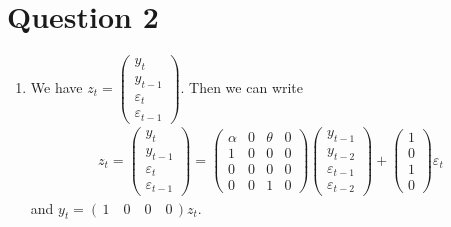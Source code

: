\documentclass[12pt]{article}
\begin{document}
\section*{Question 2}
\begin{enumerate}[label=\alph*.]
    \item We have $z_t = \begin{pmatrix}
        y_t \\
        y_{t-1} \\
        \varepsilon_t \\
        \varepsilon_{t-1}
    \end{pmatrix}$. Then we can write
    \begin{align*}
        z_t = \begin{pmatrix}
            y_t \\
            y_{t-1} \\
            \varepsilon_t \\
            \varepsilon_{t-1}
        \end{pmatrix}
        = \begin{pmatrix}
            \alpha & 0 & \theta & 0 \\
            1 & 0 & 0 & 0 \\
            0 & 0 & 0 & 0 \\
            0 & 0 & 1 & 0
        \end{pmatrix}
        \begin{pmatrix}
            y_{t-1} \\
            y_{t-2} \\
            \varepsilon_{t-1} \\
            \varepsilon_{t-2}
        \end{pmatrix}
        + \begin{pmatrix}
            1 \\
            0 \\ 
            1 \\
            0
        \end{pmatrix}
        \varepsilon_t
    \end{align*}
    and $y_t = (\, 1 \quad 0 \quad 0 \quad 0\, ) z_t$.


\end{enumerate}
\end{document}
